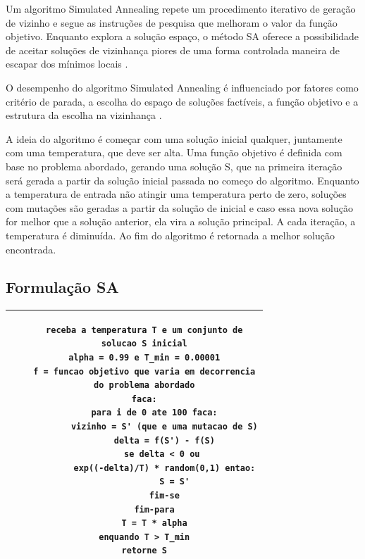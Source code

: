 \documentclass[journal]{IEEEtran}
\begin{document}
Um algoritmo Simulated Annealing repete um procedimento iterativo de geração de vizinho e segue as instruções de pesquisa que melhoram o valor da função objetivo. Enquanto explora a solução espaço, o método SA oferece a possibilidade de aceitar soluções de vizinhança piores de uma forma controlada maneira de escapar dos mínimos locais \cite{BOULEIMEN}.

O desempenho do algoritmo Simulated Annealing  é influenciado por fatores como critério de parada, a escolha do espaço de soluções factíveis, a função objetivo e a estrutura da escolha na vizinhança \cite{FUCHIGAMI}.

A ideia do algoritmo é começar com uma solução inicial qualquer, juntamente com uma temperatura, que deve ser alta. Uma função objetivo é definida com base no problema abordado, gerando uma solução S, que na primeira iteração será gerada a partir da solução inicial passada no começo do algoritmo. Enquanto a temperatura de entrada não atingir uma temperatura perto de zero,  soluções com mutações são geradas a partir da solução de inicial e caso essa nova solução for melhor que a solução anterior, ela vira a solução principal.  A cada  iteração, a temperatura é diminuída. Ao fim do algoritmo é retornada a melhor solução encontrada.

\subsection{Formulação SA}

\label{formulacao_seqsa}
\begin{table}[H]
    \centering
    \begin{tabular}{|c|}\hline
     \begin{lstlisting} 
    receba a temperatura T e um conjunto de
    solucao S inicial
    alpha = 0.99 e T_min = 0.00001
    f = funcao objetivo que varia em decorrencia
    do problema abordado
    faca:
        para i de 0 ate 100 faca:
            vizinho = S' (que e uma mutacao de S)
            delta = f(S') - f(S)
            se delta < 0 ou 
            exp((-delta)/T) * random(0,1) entao:
                S = S'
            fim-se
        fim-para
        T = T * alpha
    enquando T > T_min
    retorne S
    
\end{lstlisting} \\
         \hline
    \end{tabular}
    \label{tab:pseudo_seqSA}
\end{table}
\end{document}
